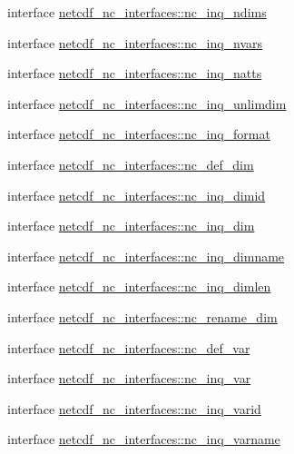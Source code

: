 \begin{DoxyCompactItemize}
interface \hyperlink{interfacenetcdf__nc__interfaces_1_1nc__inq__ndims}{netcdf\+\_\+nc\+\_\+interfaces\+::nc\+\_\+inq\+\_\+ndims}
\item 
interface \hyperlink{interfacenetcdf__nc__interfaces_1_1nc__inq__nvars}{netcdf\+\_\+nc\+\_\+interfaces\+::nc\+\_\+inq\+\_\+nvars}
\item 
interface \hyperlink{interfacenetcdf__nc__interfaces_1_1nc__inq__natts}{netcdf\+\_\+nc\+\_\+interfaces\+::nc\+\_\+inq\+\_\+natts}
\item 
interface \hyperlink{interfacenetcdf__nc__interfaces_1_1nc__inq__unlimdim}{netcdf\+\_\+nc\+\_\+interfaces\+::nc\+\_\+inq\+\_\+unlimdim}
\item 
interface \hyperlink{interfacenetcdf__nc__interfaces_1_1nc__inq__format}{netcdf\+\_\+nc\+\_\+interfaces\+::nc\+\_\+inq\+\_\+format}
\item 
interface \hyperlink{interfacenetcdf__nc__interfaces_1_1nc__def__dim}{netcdf\+\_\+nc\+\_\+interfaces\+::nc\+\_\+def\+\_\+dim}
\item 
interface \hyperlink{interfacenetcdf__nc__interfaces_1_1nc__inq__dimid}{netcdf\+\_\+nc\+\_\+interfaces\+::nc\+\_\+inq\+\_\+dimid}
\item 
interface \hyperlink{interfacenetcdf__nc__interfaces_1_1nc__inq__dim}{netcdf\+\_\+nc\+\_\+interfaces\+::nc\+\_\+inq\+\_\+dim}
\item 
interface \hyperlink{interfacenetcdf__nc__interfaces_1_1nc__inq__dimname}{netcdf\+\_\+nc\+\_\+interfaces\+::nc\+\_\+inq\+\_\+dimname}
\item 
interface \hyperlink{interfacenetcdf__nc__interfaces_1_1nc__inq__dimlen}{netcdf\+\_\+nc\+\_\+interfaces\+::nc\+\_\+inq\+\_\+dimlen}
\item 
interface \hyperlink{interfacenetcdf__nc__interfaces_1_1nc__rename__dim}{netcdf\+\_\+nc\+\_\+interfaces\+::nc\+\_\+rename\+\_\+dim}
\item 
interface \hyperlink{interfacenetcdf__nc__interfaces_1_1nc__def__var}{netcdf\+\_\+nc\+\_\+interfaces\+::nc\+\_\+def\+\_\+var}
\item 
interface \hyperlink{interfacenetcdf__nc__interfaces_1_1nc__inq__var}{netcdf\+\_\+nc\+\_\+interfaces\+::nc\+\_\+inq\+\_\+var}
\item 
interface \hyperlink{interfacenetcdf__nc__interfaces_1_1nc__inq__varid}{netcdf\+\_\+nc\+\_\+interfaces\+::nc\+\_\+inq\+\_\+varid}
\item 
interface \hyperlink{interfacenetcdf__nc__interfaces_1_1nc__inq__varname}{netcdf\+\_\+nc\+\_\+interfaces\+::nc\+\_\+inq\+\_\+varname}

\end{DoxyCompactItemize}
